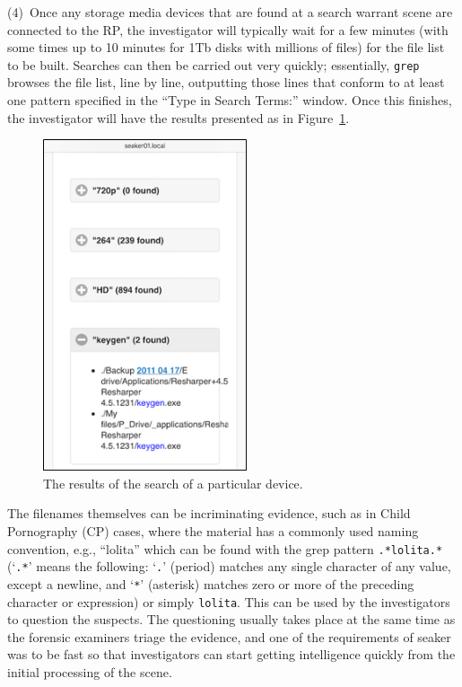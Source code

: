 \documentclass[12pt]{article}
\begin{document}
(4)~Once any storage media devices that are found at a search warrant scene
are connected to the RP, the investigator will typically wait for a
few minutes (with some times up to 10 minutes for 1Tb disks with
millions of files) for the file list to be built. Searches can then
be carried out very quickly; essentially, \verb|grep| browses the file
list, line by line, outputting those lines that conform to at least
one pattern specified in the ``Type in Search Terms:'' window. Once
this finishes, the investigator will have the results presented as in
Figure~\ref{fig:screen-3}.

\begin{figure}[H]
  \begin{center}
  \includegraphics[width=6cm]{images/seaker-hh-screen-3.jpg}
  \caption{The results of the search of a particular device.}
  \label{fig:screen-3}
  \end{center}
\end{figure}

The filenames themselves can be incriminating evidence, such as in
Child Pornography (CP) cases, where the material has a commonly used
naming convention, e.g., ``lolita'' which can be found with the grep
pattern \verb|.*lolita.*| (`\verb|.*|' means the
following: `\verb|.|' (period)  matches any single character of any
value, except
a newline, and `\verb|*|' (asterisk) matches zero or more of the
preceding character or expression) or simply \verb|lolita|.
This can be used by the
investigators to question the suspects.  The questioning usually
takes place at the same time as the forensic examiners triage the
evidence, and one of the requirements of \gls{seaker} was to be fast so that
investigators can start getting intelligence quickly from the initial
processing of the scene.\\
\end{document}
